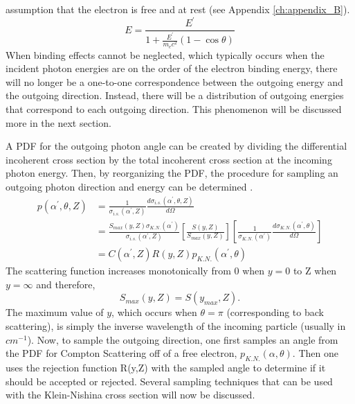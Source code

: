 assumption that the electron is free and at rest (see Appendix 
\ref{ch:appendix_B}). 
\begin{equation}
  E = \frac{E^{'}}{1 + \frac{E^{'}}{m_ec^2}(1 - \cos{\theta})}
  \label{eq:compton_scattering_energy_rel}
\end{equation}
When binding effects cannot be neglected, which typically occurs when the 
incident photon energies are on the order of the electron binding energy, there 
will no longer be a one-to-one correspondence between the outgoing energy and 
the outgoing direction. Instead, there will be a distribution of outgoing 
energies that correspond to each outgoing direction. This phenomenon will be 
discussed more in the next section.

A PDF for the outgoing photon angle can be created by dividing the differential
incoherent cross section by the total incoherent cross section at the incoming
photon energy. Then, by reorganizing the PDF, the procedure for sampling an
outgoing photon direction and energy can be determined 
\citep{persliden_monte_1983}.
\begin{align}
  p(\alpha^{'},\theta,Z) & = \frac{1}{\sigma_{i.s.}(\alpha^{'},Z)}
  \frac{d\sigma_{i.s.}(\alpha^{'},\theta,Z)}{d\Omega} \nonumber \\
  & = \frac{S_{max}(y,Z) \sigma_{K.N.}(\alpha^{'})}{\sigma_{i.s.}(\alpha^{'},Z)}
  \left[ \frac{S(y,Z)}{S_{max}(y,Z)} \right]
  \left[ \frac{1}{\sigma_{K.N.}(\alpha^{'})} 
    \frac{d\sigma_{K.N.}(\alpha^{'},\theta)}
         {d\Omega} \right] \nonumber \\
  & = C(\alpha^{'},Z) R(y,Z) p_{K.N.}(\alpha^{'},\theta) 
  \label{eq:incoherent_sampling_pdf}
\end{align}
The scattering function increases monotonically from 0 when $y=0$ to Z when
$y=\infty$ and therefore,
\begin{equation*} 
S_{max}(y,Z) = S(y_{max},Z).
\end{equation*}
The maximum value of $y$, which occurs when $\theta = \pi$ (corresponding to
back scattering), is simply the inverse wavelength of the incoming 
particle (usually in $cm^{-1}$). Now, to sample the outgoing direction, one 
first samples an angle from the PDF for Compton Scattering off of a free 
electron, $p_{K.N.}(\alpha,\theta)$. Then one uses the rejection function R(y,Z)
with the sampled angle to determine if it should be accepted or rejected. 
Several sampling techniques that can be used with the Klein-Nishina cross 
section will now be discussed.

